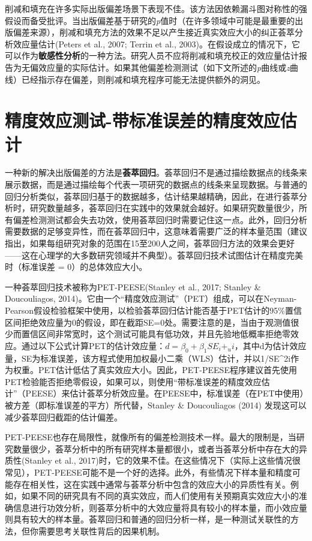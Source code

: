 \documentclass[
  letterpaper,
  DIV=11,
  numbers=noendperiod]{scrreprt}
\begin{document}
削减和填充在许多实际出版偏差场景下表现不佳。该方法因依赖漏斗图对称性的强假设而备受批评。当出版偏差基于研究的\emph{p}值时（在许多领域中可能是最重要的出版偏差来源），削减和填充方法的效果不足以产生接近真实效应大小的纠正荟萃分析效应量估计(Peters
et al., 2007; Terrin et al.,
2003)。在假设成立的情况下，它可以作为\textbf{敏感性分析}的一种方法。研究人员不应将削减和填充校正的效应量估计报告为无偏效应量的实际估计。如果其他偏差检测测试（如下文所述的\emph{p}曲线或\emph{z}曲线）已经指示存在偏差，则削减和填充程序可能无法提供额外的洞见。

\hypertarget{ux7cbeux5ea6ux6548ux5e94ux6d4bux8bd5-ux5e26ux6807ux51c6ux8befux5deeux7684ux7cbeux5ea6ux6548ux5e94ux4f30ux8ba1}{%
\section{精度效应测试-带标准误差的精度效应估计}\label{ux7cbeux5ea6ux6548ux5e94ux6d4bux8bd5-ux5e26ux6807ux51c6ux8befux5deeux7684ux7cbeux5ea6ux6548ux5e94ux4f30ux8ba1}}

一种新的解决出版偏差的方法是\textbf{荟萃回归}。荟萃回归不是通过描绘数据点的线条来展示数据，而是通过描绘每个代表一项研究的数据点的线条来呈现数据。与普通的回归分析类似，荟萃回归基于的数据越多，估计结果越精确，因此，在进行荟萃分析时，研究数量越多，荟萃回归在实践中的效果就会越好。如果研究数量很少，所有偏差检测测试都会失去功效，使用荟萃回归时需要记住这一点。此外，回归分析需要数据的足够变异性，而在荟萃回归中，这意味着需要广泛的样本量范围（建议指出，如果每组研究对象的范围在15至200人之间，荟萃回归方法的效果会更好------这在心理学的大多数研究领域并不典型）。荟萃回归技术试图估计在精度完美时（标准误差
= 0）的总体效应大小。

一种荟萃回归技术被称为PET-PEESE(Stanley et al., 2017; Stanley \&
Doucouliagos,
2014)。它由一个``精度效应测试''（PET）组成，可以在Neyman-Pearson假设检验框架中使用，以检验荟萃回归估计能否基于PET估计的95\%置信区间拒绝效应量为0的假设，即在截距SE=0处。需要注意的是，当由于观测值很少而置信区间非常宽时，这个测试可能具有低功效，并且先验地低概率拒绝零效应。通过以下公式计算PET的估计效应量：\(d = β_0 + β_1SE_i + _ui\)，其中d为估计效应量，SE为标准误差，该方程式使用加权最小二乘（WLS）估计，并以1/SE\^{}2i作为权重。PET估计低估了真实效应大小。因此，PET-PEESE程序建议首先使用PET检验能否拒绝零假设，如果可以，则使用``带标准误差的精度效应估计''（PEESE）来估计荟萃分析效应量。在PEESE中，标准误差（在PET中使用）被方差（即标准误差的平方）所代替，Stanley
\& Doucouliagos (2014) 发现这可以减少荟萃回归截距的估计偏差。

PET-PEESE也存在局限性，就像所有的偏差检测技术一样。最大的限制是，当研究数量很少，荟萃分析中的所有研究样本量都很小，或者当荟萃分析中存在大的异质性(Stanley
et al.,
2017)时，它的效果不佳。在这些情况下（实际上这些情况很常见），PET-PEESE可能不是一个好的选择。此外，有些情况下样本量和精度可能存在相关性，这在实践中通常与荟萃分析中包含的效应大小的异质性有关。例如，如果不同的研究具有不同的真实效应，而人们使用有关预期真实效应大小的准确信息进行功效分析，则荟萃分析中的大效应量将具有较小的样本量，而小效应量则具有较大的样本量。荟萃回归和普通的回归分析一样，是一种测试关联性的方法，但你需要思考关联性背后的因果机制。
\end{document}
